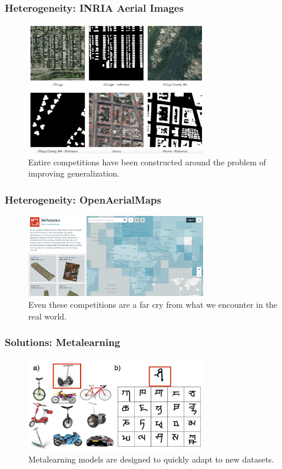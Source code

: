 \documentclass[10pt,mathserif]{beamer}
\begin{document}
\begin{frame}
  \frametitle{Heterogeneity: INRIA Aerial Images}
  \begin{figure}[ht]
    \centering
    \includegraphics[width=0.7\textwidth]{figures/inria}
    \caption{Entire competitions have been constructed around the problem of
      improving generalization. \label{fig:label} }
  \end{figure}
\end{frame}

\begin{frame}
  \frametitle{Heterogeneity: OpenAerialMaps}
  \begin{figure}[ht]
    \centering
    \includegraphics[width=0.7\textwidth]{figures/openaerialmaps}
    \caption{Even these competitions are a far cry from what we encounter in the
      real world.
      \label{fig:label} }
  \end{figure}
\end{frame}

\begin{frame}
  \frametitle{Solutions: Metalearning}
  \begin{figure}[ht]
    \centering
    \includegraphics[width=0.7\textwidth]{figures/metalearning}
    \caption{Metalearning models are designed to quickly adapt to new
      datasets. \label{fig:label} }
  \end{figure}
\end{frame}
\end{document}
